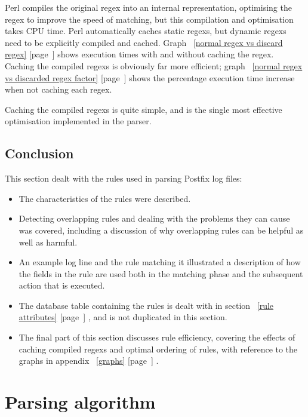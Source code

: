 \documentclass[a4paper,12pt,draft]{article}
\newcommand{\refwithpage}[1]{%
    \empty{}\ref{#1} [page~\pageref{#1}]%
}
\begin{document}
Perl compiles the original regex into an internal representation,
optimising the regex to improve the speed of matching, but this compilation
and optimisation takes CPU time.  Perl automatically caches static regexs,
but dynamic regexs need to be explicitly compiled and cached.
Graph~\refwithpage{normal regex vs discard regex} shows execution times
with and without caching the regex.  Caching the compiled regexs is
obviously far more efficient; graph~\refwithpage{normal regex vs discarded
regex factor} shows the percentage execution time increase when not caching
each regex.

Caching the compiled regexs is quite simple, and is the single most
effective optimisation implemented in the parser.

\subsection{Conclusion}

This section dealt with the rules used in parsing Postfix log files:

\begin{itemize}

    \item The characteristics of the rules were described.

    \item Detecting overlapping rules and dealing with the problems they
        can cause was covered, including a discussion of why overlapping
        rules can be helpful as well as harmful.

    \item An example log line and the rule matching it illustrated a
        description of how the fields in the rule are used both in the
        matching phase and the subsequent action that is executed.

    \item The database table containing the rules is dealt with in
        section~\refwithpage{rule attributes}, and is not duplicated in
        this section.

    \item The final part of this section discusses rule efficiency,
        covering the effects of caching compiled regexs and optimal
        ordering of rules, with reference to the graphs in
        appendix~\refwithpage{graphs}.

\end{itemize}

\section{Parsing algorithm}
\end{document}
